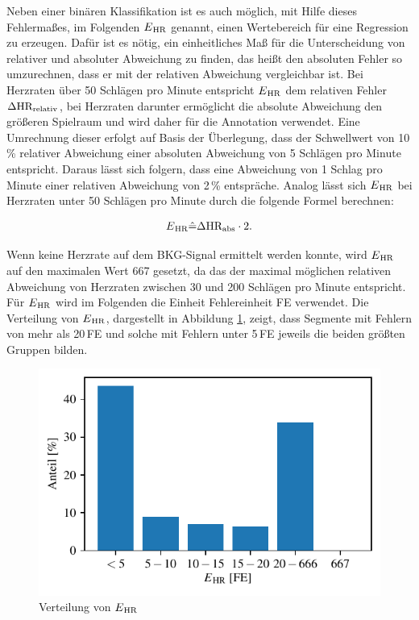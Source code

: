 	Neben einer binären Klassifikation ist es auch möglich, mit Hilfe dieses Fehlermaßes, im Folgenden $E\textsubscript{HR}$ genannt, einen Wertebereich für eine Regression zu erzeugen. Dafür ist es nötig, ein einheitliches Maß für die Unterscheidung von relativer und absoluter Abweichung zu finden, das heißt den absoluten Fehler so umzurechnen, dass er mit der relativen Abweichung vergleichbar ist. Bei Herzraten über 50 Schlägen pro Minute entspricht $E\textsubscript{HR}$ dem relativen Fehler $\Delta\text{HR}\textsubscript{relativ}$, bei Herzraten darunter ermöglicht die absolute Abweichung den größeren Spielraum und wird daher für die Annotation verwendet. Eine Umrechnung dieser erfolgt auf Basis der Überlegung, dass der Schwellwert von 10\,\% relativer Abweichung einer absoluten Abweichung von 5 Schlägen pro Minute entspricht. Daraus lässt sich folgern, dass eine Abweichung von 1 Schlag pro Minute einer relativen Abweichung von 2\,\% entspräche. Analog lässt sich $E\textsubscript{HR}$ bei Herzraten unter 50 Schlägen pro Minute durch die folgende Formel berechnen:
	
	\begin{align*}
		E\textsubscript{HR} \hat{=} \Delta\text{HR}\textsubscript{abs} \cdot 2.
	\end{align*}
	
	Wenn keine Herzrate auf dem \ac{BKG}-Signal ermittelt werden konnte, wird $E\textsubscript{HR}$ auf den maximalen Wert 667 gesetzt, da das der maximal möglichen relativen Abweichung von Herzraten zwischen 30 und 200 Schlägen pro Minute entspricht. Für $E\textsubscript{HR}$ wird im Folgenden die Einheit Fehlereinheit \si{FE} verwendet. Die Verteilung von $E\textsubscript{HR}$, dargestellt in Abbildung \ref{fig:class-histo}, zeigt, dass Segmente mit Fehlern von mehr als 20\,\si{FE} und solche mit Fehlern unter 5\,\si{FE} jeweils die beiden größten Gruppen bilden.
	
	
	\begin{figure}[H]
		\centering
		\includegraphics{pic/data-E-HR-bar.pdf}
		\caption[Verteilung von $E\textsubscript{HR}$ auf allen Messdaten]{Verteilung von $E\textsubscript{HR}$}
		\label{fig:class-histo}
	\end{figure}
	
	
	